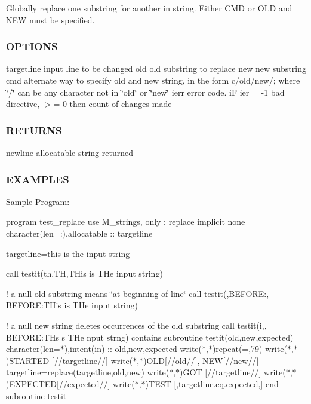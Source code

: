 Globally replace one substring for another in string. Either C\+MD or O\+LD and N\+EW must be specified.

\subsubsection*{O\+P\+T\+I\+O\+NS}

targetline input line to be changed old old substring to replace new new substring cmd alternate way to specify old and new string, in the form c/old/new/; where \char`\"{}/\char`\"{} can be any character not in \char`\"{}old\char`\"{} or \char`\"{}new\char`\"{} ierr error code. iF ier = -\/1 bad directive, $>$= 0 then count of changes made \subsubsection*{R\+E\+T\+U\+R\+NS}

newline allocatable string returned

\subsubsection*{E\+X\+A\+M\+P\+L\+ES}

Sample Program\+:

program test\+\_\+replace use M\+\_\+strings, only \+: replace implicit none character(len=\+:),allocatable \+:\+: targetline

targetline=\textquotesingle{}this is the input string\textquotesingle{}

call testit(\textquotesingle{}th\textquotesingle{},\textquotesingle{}TH\textquotesingle{},\textquotesingle{}T\+His is T\+He input string\textquotesingle{})

! a null old substring means \char`\"{}at beginning of line\char`\"{} call testit(\textquotesingle{}\textquotesingle{},\textquotesingle{}B\+E\+F\+O\+RE\+:\textquotesingle{}, \textquotesingle{}B\+E\+F\+O\+RE\+:T\+His is T\+He input string\textquotesingle{})

! a null new string deletes occurrences of the old substring call testit(\textquotesingle{}i\textquotesingle{},\textquotesingle{}\textquotesingle{}, \textquotesingle{}B\+E\+F\+O\+RE\+:T\+Hs s T\+He nput strng\textquotesingle{}) contains subroutine testit(old,new,expected) character(len=$\ast$),intent(in) \+:\+: old,new,expected write($\ast$,$\ast$)repeat(\textquotesingle{}=\textquotesingle{},79) write($\ast$,$\ast$)\textquotesingle{}S\+T\+A\+R\+T\+ED \mbox{[}\textquotesingle{}//targetline//\textquotesingle{}\mbox{]}\textquotesingle{} write($\ast$,$\ast$)\textquotesingle{}O\+LD\mbox{[}\textquotesingle{}//old//\textquotesingle{}\mbox{]}\textquotesingle{}, \textquotesingle{} N\+EW\mbox{[}\textquotesingle{}//new//\textquotesingle{}\mbox{]}\textquotesingle{} targetline=replace(targetline,old,new) write($\ast$,$\ast$)\textquotesingle{}G\+OT \mbox{[}\textquotesingle{}//targetline//\textquotesingle{}\mbox{]}\textquotesingle{} write($\ast$,$\ast$)\textquotesingle{}E\+X\+P\+E\+C\+T\+ED\mbox{[}\textquotesingle{}//expected//\textquotesingle{}\mbox{]}\textquotesingle{} write($\ast$,$\ast$)\textquotesingle{}T\+E\+ST \mbox{[}\textquotesingle{},targetline.\+eq.\+expected,\textquotesingle{}\mbox{]}\textquotesingle{} end subroutine testit

